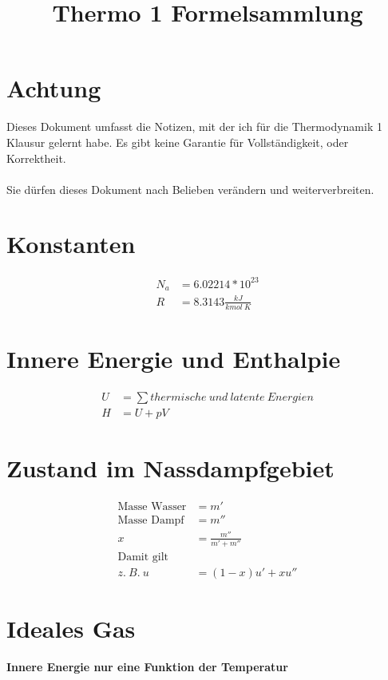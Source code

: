 \documentclass[12pt]{article}
\title{Thermo 1 Formelsammlung}
\author{}
\begin{document}
\maketitle
\renewcommand{\arraystretch}{2}

\section{Achtung}
Dieses Dokument umfasst die Notizen, mit der ich für die Thermodynamik 1 Klausur gelernt habe. Es gibt keine Garantie für Vollständigkeit, oder Korrektheit. \\ \\
Sie dürfen dieses Dokument nach Belieben verändern und weiterverbreiten.

\section{Konstanten}

\begin{align*}
N_a&=6.02214*10^23\\
R &= 8.3143 \frac{kJ}{kmol \: K}
\end{align*}

\section{Innere Energie und Enthalpie}

\begin{align*}
U &=\sum thermische \: und \: latente \: Energien \\
H &=U+pV
\end{align*}

\section{Zustand im Nassdampfgebiet}
\begin{align*}
\text{Masse Wasser} &= m' \\
\text{Masse Dampf} &= m'' \\
x&= \frac{m''}{m'+m''} \\
\text{Damit gilt} &\\
z. \: B. \: u&= (1-x)u'+xu''
\end{align*}

\pagebreak

\section{Ideales Gas}
\textbf{Innere Energie nur eine Funktion der Temperatur}
\end{document}
